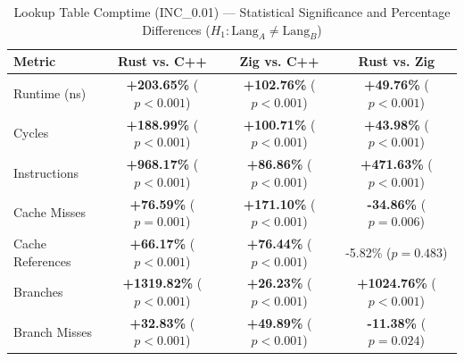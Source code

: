 \begin{table}[htbp]
\centering
\caption{Lookup Table Comptime (INC_0.01) --- Statistical Significance and Percentage Differences ($H_1: \text{Lang}_A \neq \text{Lang}_B$)}
\label{tab:lut_comptime_0_01}
\begin{tabular}{l ccc}
\toprule
\textbf{Metric} & \textbf{Rust vs. C++} & \textbf{Zig vs. C++} & \textbf{Rust vs. Zig} \\
\midrule
Runtime (ns) & \textbf{+203.65\%} ($p < 0.001$) & \textbf{+102.76\%} ($p < 0.001$) & \textbf{+49.76\%} ($p < 0.001$) \\
Cycles & \textbf{+188.99\%} ($p < 0.001$) & \textbf{+100.71\%} ($p < 0.001$) & \textbf{+43.98\%} ($p < 0.001$) \\
Instructions & \textbf{+968.17\%} ($p < 0.001$) & \textbf{+86.86\%} ($p < 0.001$) & \textbf{+471.63\%} ($p < 0.001$) \\
Cache Misses & \textbf{+76.59\%} ($p = 0.001$) & \textbf{+171.10\%} ($p < 0.001$) & \textbf{-34.86\%} ($p = 0.006$) \\
Cache References & \textbf{+66.17\%} ($p < 0.001$) & \textbf{+76.44\%} ($p < 0.001$) & -5.82\% ($p = 0.483$) \\
Branches & \textbf{+1319.82\%} ($p < 0.001$) & \textbf{+26.23\%} ($p < 0.001$) & \textbf{+1024.76\%} ($p < 0.001$) \\
Branch Misses & \textbf{+32.83\%} ($p < 0.001$) & \textbf{+49.89\%} ($p < 0.001$) & \textbf{-11.38\%} ($p = 0.024$) \\
\bottomrule
\end{tabular}
\end{table}


